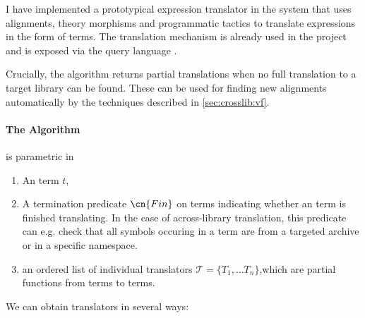 I have implemented a prototypical expression translator in the \mmt system that uses alignments, theory morphisms and programmatic tactics to translate expressions in the form of \mmt terms.
The translation mechanism is already used in the \ODK project and is exposed via the \mmt query language \cite{Rabe:qlfml12}. 

Crucially, the algorithm returns partial translations when no full translation to a target library can be found. These can be used for finding new alignments automatically by the techniques described in \autoref{sec:crosslib:vf}.

\paragraph{The Algorithm} is parametric in
\begin{enumerate}
	\item An \mmt term $t$,
	\item A termination predicate $\cn{Fin}$ on \mmt terms indicating whether an \mmt term is finished translating. In the case of across-library translation, this predicate can e.g. check that all symbols occuring in a term are from a targeted \mmt archive or in a specific namespace.
	\item an ordered list of individual translators $\mathcal T=\{T_1,\ldots T_n\}$,which are partial functions from \mmt terms to \mmt terms.
\end{enumerate}
We can obtain translators in several ways:
